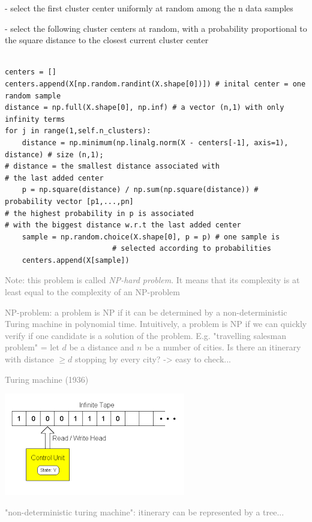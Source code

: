 - select the first cluster center uniformly at random among the n data samples

- select the following cluster centers at random, with a probability proportional to the square distance to the closest current cluster center

\lstset{language=Python}
\lstset{frame=lines}
\lstset{basicstyle=\footnotesize}
\begin{lstlisting}

centers = []
centers.append(X[np.random.randint(X.shape[0])]) # inital center = one random sample
distance = np.full(X.shape[0], np.inf) # a vector (n,1) with only infinity terms
for j in range(1,self.n_clusters):
    distance = np.minimum(np.linalg.norm(X - centers[-1], axis=1), distance) # size (n,1); 
# distance = the smallest distance associated with 
# the last added center
    p = np.square(distance) / np.sum(np.square(distance)) # probability vector [p1,...,pn]
# the highest probability in p is associated 
# with the biggest distance w.r.t the last added center
    sample = np.random.choice(X.shape[0], p = p) # one sample is 
						 # selected according to probabilities
    centers.append(X[sample])

\end{lstlisting}

\textcolor{gray}{Note: this problem is called \textit{NP-hard problem}. It means that its complexity is at least equal to the complexity of an NP-problem}

\textcolor{gray}{NP-problem: a problem is NP if it can be determined by a non-deterministic Turing machine in polynomial time. Intuitively, a problem is NP if we can quickly verify if one candidate is a solution of the problem. E.g. "travelling salesman problem" = let $d$ be a distance and $n$ be a number of cities. Is there an itinerary with distance $\ge d$ stopping by every city? -> easy to check...}

\vspace{5mm}
\textcolor{gray}{Turing machine (1936)}

\includegraphics{../images/turingmachine.png}

\textcolor{gray}{"non-deterministic turing machine": itinerary can be represented by a tree...}

\vspace{5mm}

